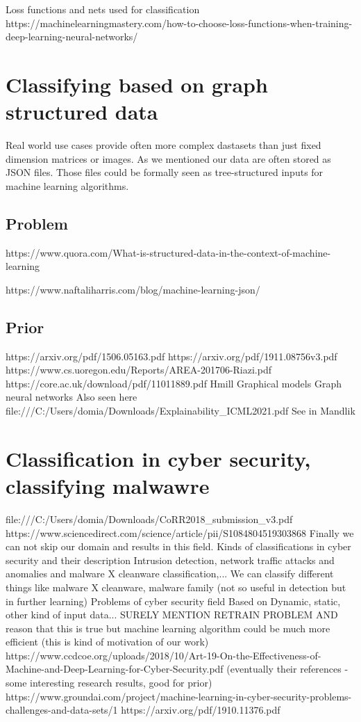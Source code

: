 Loss functions and nets used for classification
https://machinelearningmastery.com/how-to-choose-loss-functions-when-training-deep-learning-neural-networks/

\section{Classifying based on graph structured data}
Real world use cases provide often more complex dastasets than just fixed dimension matrices or images. As we mentioned our data are often stored as JSON files. Those files could be formally seen as tree-structured inputs for machine learning algorithms. 
\subsection{Problem}
https://www.quora.com/What-is-structured-data-in-the-context-of-machine-learning

https://www.naftaliharris.com/blog/machine-learning-json/

\subsection{Prior}
https://arxiv.org/pdf/1506.05163.pdf
https://arxiv.org/pdf/1911.08756v3.pdf
https://www.cs.uoregon.edu/Reports/AREA-201706-Riazi.pdf
https://core.ac.uk/download/pdf/11011889.pdf
Hmill
Graphical models
Graph neural networks
    Also seen here file:///C:/Users/domia/Downloads/Explainability_ICML2021.pdf
See in Mandlik

\section{Classification in cyber security, classifying malwawre}
file:///C:/Users/domia/Downloads/CoRR2018_submission_v3.pdf
https://www.sciencedirect.com/science/article/pii/S1084804519303868
Finally we can not skip our domain and results in this field. 
Kinds of classifications in cyber security and their description
Intrusion detection, network traffic attacks and anomalies and malware X cleanware classification,...
We can classify different things like malware X cleanware, malware family (not so useful in detection but in further learning)
Problems of cyber security field
Based on Dynamic, static, other kind of input data...
SURELY MENTION RETRAIN PROBLEM AND reason that this is true but machine learning algorithm could be much more efficient (this is kind of motivation of our work)
https://www.ccdcoe.org/uploads/2018/10/Art-19-On-the-Effectiveness-of-Machine-and-Deep-Learning-for-Cyber-Security.pdf (eventually their references - some interesting research results, good for prior)
https://www.groundai.com/project/machine-learning-in-cyber-security-problems-challenges-and-data-sets/1
https://arxiv.org/pdf/1910.11376.pdf

